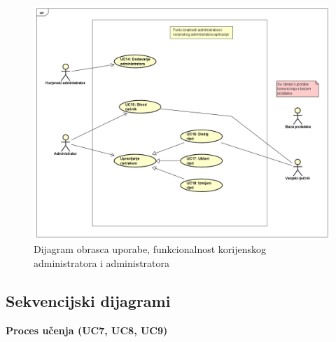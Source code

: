 					\begin{figure}[H]
						\includegraphics[width=\textwidth]{dijagrami/ucdiag2.png} %
						\caption{Dijagram obrasca uporabe, funkcionalnost korijenskog administratora i administratora}
						\label{fig:ucdiag2} %
					\end{figure}

				\eject		
				
			\subsection{Sekvencijski dijagrami}
				
				\textbf{Proces učenja (UC7, UC8, UC9)}\\
				
